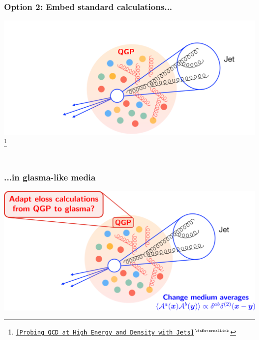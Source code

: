 \documentclass[aspectratio=169,11pt,usenames,dvipsnames]{beamer}
\renewcommand{\thefootnote}{\color{customblue}\faPaperPlaneO}
\newcommand\blfootnote[1]{%
  \begingroup
  \renewcommand\thefootnote{}\footnote{#1}%
  \addtocounter{footnote}{-1}%
  \endgroup
}
\begin{document}
\begin{frame}
    \frametitle{\\{\normalsize\color{jyured}\bfseries\sffamily Option 2: }Embed standard calculations...}
    \hspace{20pt}
        \includegraphics[width=0.8\paperwidth]{images/probingQCDqgp.png}
    \blfootnote{\scriptsize \href{https://www.int.washington.edu/programs-and-workshops/21r-2b}{{\color{blue}\texttt{[Probing QCD at High Energy and Density with Jets]$^\text{\scalebox{0.9}{\faExternalLink}}$}}}}
\end{frame}


\begin{frame}
    \frametitle{\\...in glasma-like media}
    \hspace{20pt}
        \includegraphics[width=0.8\paperwidth]{images/probingQCDglasma_v2.png}
\end{frame}
\end{document}
